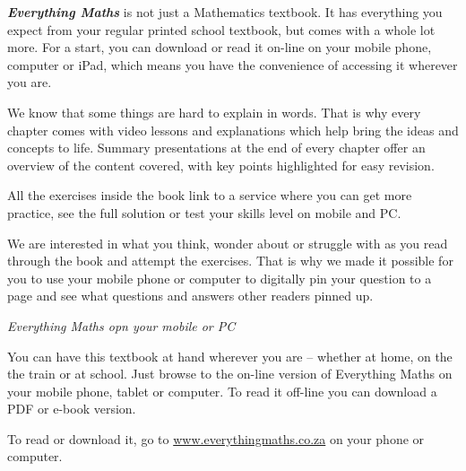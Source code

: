 \par
{
\textbf{\textit{Everything Maths}} is not just a Mathematics textbook. It has everything you expect from
your regular printed school textbook, but comes with a whole lot more. For a start, you can download or read it
on-line on your mobile phone, computer or iPad, which means you have the convenience of accessing
it wherever you are.\par


We know that some things are hard to explain in words. That is why every chapter comes with video
lessons and explanations which help bring the ideas and concepts to life. Summary presentations at
the end of every chapter offer an overview of the content covered, with key points highlighted for easy
revision.\par


All the exercises inside the book link to a service where you can get more practice, see the full solution
or test your skills level on mobile and PC.\par


We are interested in what you think, wonder about or struggle with as you read through the book and
attempt the exercises. That is why we made it possible for you to use your mobile phone or computer to
digitally pin your question to a page and see what questions and answers other readers pinned up.\par


}




\newpage
\thispagestyle{empty}

{\normalfont\sffamily\fontsize{22}\normalfont\itshape Everything Maths opn your mobile or PC} \par

{
You can have this textbook at hand wherever you are – whether at home, on the the train or at school.
Just browse to the on-line version of Everything Maths on your mobile phone, tablet or computer. To
read it off-line you can download a PDF or e-book version.\par


To read or download it, go to \underline{www.everythingmaths.co.za} on your phone or computer.} \vspace*{1cm}


